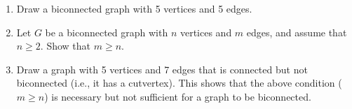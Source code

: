 \begin{enumerate}
\item  Draw a biconnected graph with 5 vertices and 5 edges.
\item  Let $G$ be a biconnected graph with $n$ vertices and $m$ edges,
  and assume that $n \geq  2$.  Show that $m \geq  n$.
\item  Draw a graph with 5 vertices and 7 edges that is connected
  but not biconnected (i.e., it has a cutvertex). This shows that
  the above condition ($m \geq  n$) is necessary but not sufficient for
  a graph to be biconnected.
\end{enumerate}
